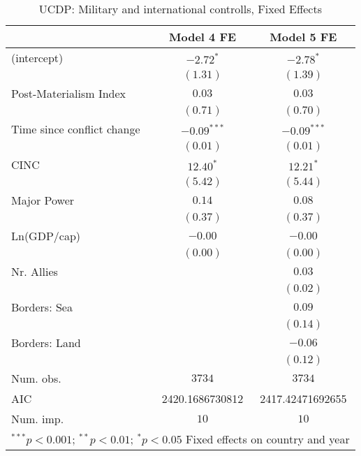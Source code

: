 
\begin{table}
\begin{center}
\begin{tabular}{l c c}
\toprule
 & Model 4 FE & Model 5 FE \\
\midrule
(intercept)                & $-2.72^{*}$     & $-2.78^{*}$      \\
                           & $(1.31)$        & $(1.39)$         \\
Post-Materialism Index     & $0.03$          & $0.03$           \\
                           & $(0.71)$        & $(0.70)$         \\
Time since conflict change & $-0.09^{***}$   & $-0.09^{***}$    \\
                           & $(0.01)$        & $(0.01)$         \\
CINC                       & $12.40^{*}$     & $12.21^{*}$      \\
                           & $(5.42)$        & $(5.44)$         \\
Major Power                & $0.14$          & $0.08$           \\
                           & $(0.37)$        & $(0.37)$         \\
Ln(GDP/cap)                & $-0.00$         & $-0.00$          \\
                           & $(0.00)$        & $(0.00)$         \\
Nr. Allies                 &                 & $0.03$           \\
                           &                 & $(0.02)$         \\
Borders: Sea               &                 & $0.09$           \\
                           &                 & $(0.14)$         \\
Borders: Land              &                 & $-0.06$          \\
                           &                 & $(0.12)$         \\
\midrule
Num. obs.                  & $3734$          & $3734$           \\
AIC                        & 2420.1686730812 & 2417.42471692655 \\
Num. imp.                  & $10$            & $10$             \\
\bottomrule
\multicolumn{3}{l}{\scriptsize{$^{***}p<0.001$; $^{**}p<0.01$; $^{*}p<0.05$ 
 Fixed effects on country and year}}
\end{tabular}
\caption{UCDP: Military and international controlls, Fixed Effects}
\label{UCDP_2_FE_PM}
\end{center}
\end{table}
